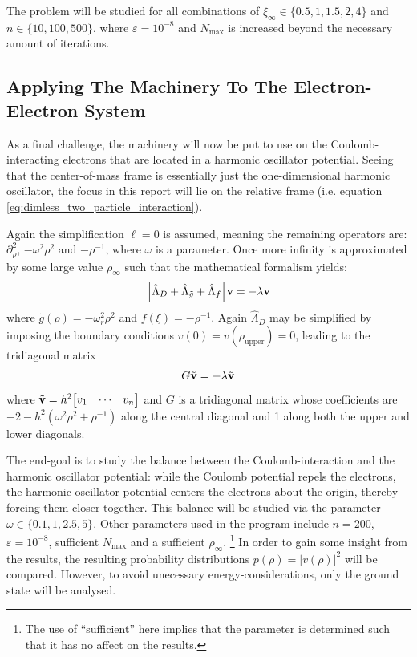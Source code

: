 \documentclass[reprint,english]{revtex4-1}
\begin{document}
The problem will be studied for all combinations of \(\xi_\infty\in\{0.5,1,1.5,2,4\}\) and \(n\in\{10,100,500\}\), where \(\varepsilon=10^{-8}\) and \(N_\text{max}\) is increased beyond the necessary amount of iterations. 
\subsection{Applying The Machinery To The Electron-Electron System}
As a final challenge, the machinery will now be put to use on the Coulomb-interacting electrons that are located in a harmonic oscillator potential. Seeing that the center-of-mass frame is essentially just the one-dimensional harmonic oscillator, the focus in this report will lie on the relative frame (i.e. equation \eqref{eq:dimless_two_particle_interaction}).

Again the simplification \(\ell=0\) is assumed, meaning the remaining operators are: \(\partial_\rho^2\), \(-\omega^2\rho^2\) and \(-\rho^{-1}\), where \(\omega\) is a parameter. Once more infinity is approximated by some large value \(\rho_\infty\) such that the mathematical formalism yields:
\begin{equation}\label{eq:discrete_dimless_interacting_electrons}
\Big[\hat{\Lambda}_D+\hat{\Lambda}_{\tilde{g}}+\hat{\Lambda}_f\Big]\vb{v}=-\lambda\vb{v}
\end{equation}
where \(\tilde{g}(\rho)=-\omega_r^2\rho^2\) and \(f(\xi)=-\rho^{-1}\). Again \(\hat{\Lambda}_D\) may be simplified by imposing the boundary conditions \(v(0)=v(\rho_\text{upper})=0\), leading to the tridiagonal matrix
\begin{equation}\label{eq:method:interacting_electrons}
G\tilde{\vb{v}}=-\lambda\tilde{\vb{v}}
\end{equation}
where \(\tilde{\vb{v}}=h^2\mqty[v_1&\cdots&v_n]\) and \(G\) is a tridiagonal matrix whose coefficients are \(-2-h^2(\omega^2\rho^2+\rho^{-1})\) along the central diagonal and 1 along both the upper and lower diagonals.

The end-goal is to study the balance between the Coulomb-interaction and the harmonic oscillator potential: while the Coulomb potential repels the electrons, the harmonic oscillator potential centers the electrons about the origin, thereby forcing them closer together. This balance will be studied via the parameter \(\omega\in\{0.1,1,2.5,5\}\). Other parameters used in the program include \(n=200\), \(\varepsilon=10^{-8}\), sufficient \(N_\text{max}\) and a sufficient \(\rho_\infty\). \footnote{The use of ``sufficient'' here implies that the parameter is determined such that it has no affect on the results.} In order to gain some insight from the results, the resulting probability distributions \(p(\rho)=|v(\rho)|^2\) will be compared. However, to avoid unecessary energy-considerations, only the ground state will be analysed.
\end{document}
